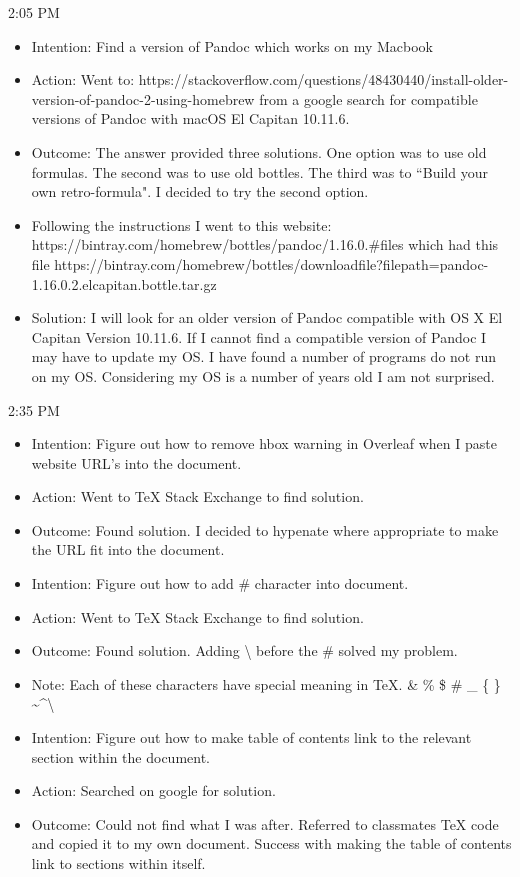 \documentclass{article}
\begin{document}
2:05 PM

\begin{itemize}
    \item Intention: Find a version of Pandoc which works on my Macbook
    \item Action: Went to: https://stackoverflow.com/questions/48430440/install-older-version-of-pandoc-2-using-homebrew from a google search for compatible versions of Pandoc with macOS El Capitan 10.11.6.
    \item Outcome: The answer provided three solutions. One option was to use old formulas. The second was to use old bottles. The third was to ``Build your own retro-formula". I decided to try the second option.
    \item Following the instructions I went to this website: https://bintray.com/homebrew/bottles/pandoc/1.16.0.\#files which had this file https://bintray.com/homebrew/bottles/download\textunderscore  file?file\textunderscore path=pandoc-1.16.0\-.2.el\textunderscore capitan.bottle.tar.gz
    \item Solution: I will look for an older version of Pandoc compatible with OS X El Capitan Version 10.11.6. If I cannot find a compatible version of Pandoc I may have to update my OS. I have found a number of programs do not run on my OS. Considering my OS is a number of years old I am not surprised.
\end{itemize}

2:35 PM

\begin{itemize}
    \item Intention: Figure out how to remove hbox warning in Overleaf when I paste website URL's into the document.
    \item Action: Went to TeX Stack Exchange to find solution.
    \item Outcome: Found solution. I decided to hypenate where appropriate to make the URL fit into the document.

    \item Intention: Figure out how to add \# character into document.
    \item Action: Went to TeX Stack Exchange to find solution.
    \item Outcome: Found solution. Adding {\textbackslash} before the \# solved my problem.
    \item Note: Each of these characters have special meaning in TeX. \& \% \$ \# \_ \{ \} \textasciitilde \textasciicircum \textbackslash
    \item Intention: Figure out how to make table of contents link to the relevant section within the document.
    \item Action: Searched on google for solution.
    \item Outcome: Could not find what I was after. Referred to classmates TeX code and copied it to my own document. Success with making the table of contents link to sections within itself.
\end{itemize}
\end{document}
